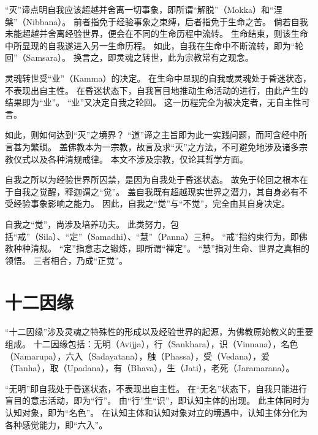 \documentclass[11pt]{article}
\begin{document}
\newline

“灭”谛点明自我应该超越并舍离一切事象，即所谓“解脱”（Mokka）和“涅槃”（Nibbana）。
前者指免于经验事象之束缚，后者指免于生命之苦。
倘若自我未能超越并舍离经验世界，便会在不同的生命历程中流转。
生命结束，则该生命中所显现的自我遂进入另一生命历程。
如此，自我在生命中不断流转，即为“轮回”（Samsara）。
换言之，即灵魂之转世，此为宗教常有之观念。

\newline

灵魂转世受“业”（Kamma）的决定。
在生命中显现的自我或灵魂处于昏迷状态，不表现出自主性。
在昏迷状态下，自我盲目地推动生命活动的进行，由此产生的结果即为“业”。
“业”又决定自我之轮回。
这一历程完全为被决定者，无自主性可言。

\newline

如此，则如何达到“灭”之境界？
“道”谛之主旨即为此一实践问题，而阿含经中所言甚为繁琐。
盖佛教本为一宗教，故言及求“灭”之方法，不可避免地涉及诸多宗教仪式以及各种清规戒律。
本文不涉及宗教，仅论其哲学方面。

\newline

自我之所以为经验世界所囚禁，是因为自我处于昏迷状态。
故免于轮回之根本在于自我之觉醒，释迦谓之“觉”。
盖自我既有超越现实世界之潜力，其自身必有不受经验事象影响之能力。
因此，自我之“觉”与“不觉”，完全由其自身决定。

\newline

自我之“觉”，尚涉及培养功夫。
此类努力，包括“戒”（Sila）、“定”（Samadhi）、“慧”（Panna）三种。
“戒”指约束行为，即佛教种种清规。
“定”指意志之锻炼，即所谓“禅定”。
“慧”指对生命、世界之真相的领悟。
三者相合，乃成“正觉”。

\section{十二因缘}
“十二因缘”涉及灵魂之特殊性的形成以及经验世界的起源，为佛教原始教义的重要组成。
十二因缘包括：无明（Avijja），行（Sankhara），识（Vinnana），名色（Namarupa），六入（Sadayatana），触（Phassa），受（Vedana），爱（Tanha），取（Upadana），有（Bhava），生（Jati），老死（Jaramarana）。

\newline

“无明”即自我处于昏迷状态，不表现出自主性。
在“无名”状态下，自我只能进行盲目的意志活动，即为“行”。
由“行”生“识”，即认知主体的出现。
此主体同时为认知对象，即为“名色”。
在认知主体和认知对象对立的境遇中，认知主体分化为各种感觉能力，即“六入”。
\end{document}
